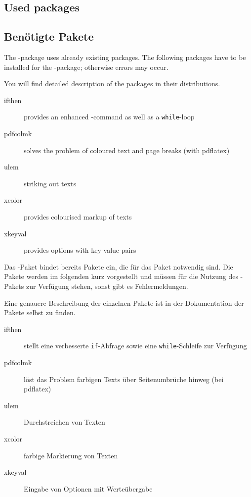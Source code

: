 \ifENGLISH
	\subsection{Used packages}
\fi
	\ifGERMAN
		\subsection{Benötigte Pakete}
	\fi
\label{sec:user:packages}

\ifENGLISH
	The -package uses already existing packages.
	The following packages have to be installed for the -package; otherwise errors may occur.

	You will find detailed description of the packages in their distributions.
	\begin{description}
	\item [ifthen] provides an enhanced -command as well as a \texttt{while}-loop
	\item [pdfcolmk] solves the problem of coloured text and page breaks (with pdflatex)
	\item [ulem] striking out texts
	\item [xcolor] provides colourised markup of texts
	\item [xkeyval] provides options with key-value-pairs
	\end{description}
\fi
	\ifGERMAN
		Das -Paket bindet bereits Pakete ein, die für das Paket notwendig sind.
		Die Pakete werden im folgenden kurz vorgestellt und müssen für die Nutzung des -Pakets zur Verfügung stehen, sonst gibt es Fehlermeldungen.

		Eine genauere Beschreibung der einzelnen Pakete ist in der Dokumentation der Pakete selbst zu finden.
		\begin{description}
		\item [ifthen] stellt eine verbesserte \texttt{if}-Abfrage sowie eine \texttt{while}-Schleife zur Verfügung
		\item [pdfcolmk] löst das Problem farbigen Texts über Seitenumbrüche hinweg (bei pdflatex)
		\item [ulem] Durchstreichen von Texten
		\item [xcolor] farbige Markierung von Texten
		\item [xkeyval] Eingabe von Optionen mit Werteübergabe
		\end{description}
	\fi

\ifENGLISH
